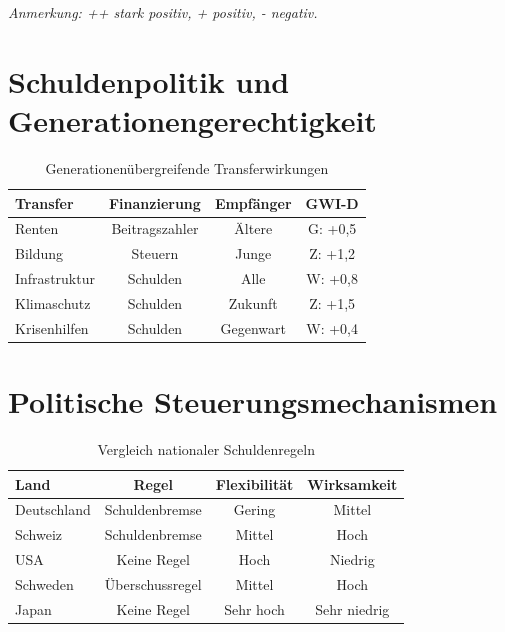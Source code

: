 \begin{flushleft}
\scriptsize{\textit{Anmerkung: ++ stark positiv, + positiv, - negativ.}}
\end{flushleft}

\section{Schuldenpolitik und Generationengerechtigkeit}

\begin{table}[ht]
    \centering
    \footnotesize
    \caption{Generationenübergreifende Transferwirkungen}
    \label{tab:transferwirkungen}
    \begin{tabular}{@{}lccc@{}}
        \toprule
        \textbf{Transfer} & \textbf{Finanzierung} & \textbf{Empfänger} & \textbf{GWI-D} \\
        \midrule
        Renten & Beitragszahler & Ältere & G: +0,5 \\
        Bildung & Steuern & Junge & Z: +1,2 \\
        Infrastruktur & Schulden & Alle & W: +0,8 \\
        Klimaschutz & Schulden & Zukunft & Z: +1,5 \\
        Krisenhilfen & Schulden & Gegenwart & W: +0,4 \\
        \bottomrule
    \end{tabular}
\end{table}

\section{Politische Steuerungsmechanismen}

\begin{table}[ht]
    \centering
    \footnotesize
    \caption{Vergleich nationaler Schuldenregeln}
    \label{tab:schuldenregeln_vergleich}
    \begin{tabular}{@{}lccc@{}}
        \toprule
        \textbf{Land} & \textbf{Regel} & \textbf{Flexibilität} & \textbf{Wirksamkeit} \\
        \midrule
        Deutschland & Schuldenbremse & Gering & Mittel \\
        Schweiz & Schuldenbremse & Mittel & Hoch \\
        USA & Keine Regel & Hoch & Niedrig \\
        Schweden & Überschussregel & Mittel & Hoch \\
        Japan & Keine Regel & Sehr hoch & Sehr niedrig \\
        \bottomrule
    \end{tabular}
\end{table}

